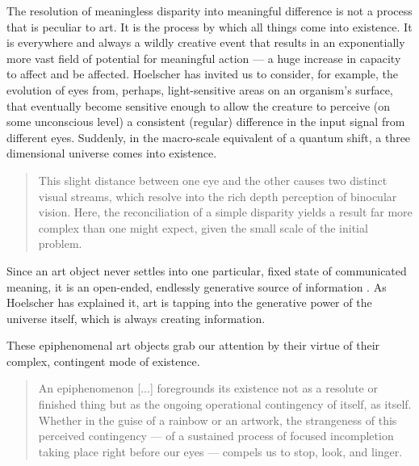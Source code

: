 \documentclass[letterpaper]{article}
\begin{document}

    The resolution of meaningless disparity into meaningful difference is not a process that is peculiar to art. It is the process by which all things come into existence. It is everywhere and always a wildly creative event that results in an exponentially more vast field of potential for meaningful action — a huge increase in capacity to affect and be affected. Hoelscher has invited us to consider, for example, the evolution of eyes from, perhaps, light-sensitive areas on an organism's surface, that eventually become sensitive enough to allow the creature to perceive (on some unconscious level) a consistent (regular) difference in the input signal from different eyes. Suddenly, in the macro-scale equivalent of a quantum shift, a three dimensional universe comes into existence.

    \begin{quote}
        This slight distance between one eye and the other causes two distinct visual streams, which resolve into the rich depth perception of binocular vision. Here, the reconciliation of a simple disparity yields a result far more complex than one might expect, given the small scale of the initial problem. \citep[p.5]{HoelscherArtAsInfrmtn2021}
    \end{quote}

    Since an art object never settles into one particular, fixed state of communicated meaning, it is an open-ended, endlessly generative source of information \citep[p.7]{HoelscherThPtcsOfPhsSpc2014}. As Hoelscher has explained it, art is tapping into the generative power of the universe itself, which is always creating information.

    These epiphenomenal art objects grab our attention by their virtue of their complex, contingent mode of existence.

    \begin{quote}
        An epiphenomenon [...] foregrounds its existence not as a resolute or finished thing but as the ongoing operational contingency of itself, as itself. Whether in the guise of a rainbow or an artwork, the strangeness of this perceived contingency — of a sustained process of focused incompletion taking place right before our eyes — compels us to stop, look, and linger.
    \end{quote}
\end{document}
